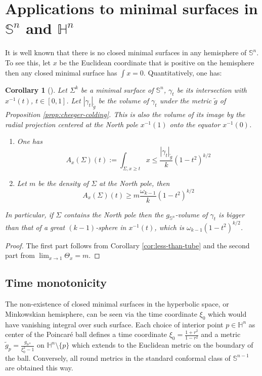 \documentclass[11pt]{article}
\newtheorem{corollary}[theorem]{Corollary}
\begin{document}
\section{Applications to minimal surfaces in \(\mathbb{S}^n\) and \(\mathbb{H}^n\)}
\label{sec:org653a069}
It is well known that there is no closed minimal surfaces in any hemisphere of \(\mathbb{S}^n\).  To see this, let \(x\) be the Euclidean coordinate that is positive on
the hemisphere then any closed minimal surface has \(\int x = 0\). 
Quantitatively, one has:
\begin{corollary}[]
\label{cor:sphere}
Let \(\Sigma^k\) be a minimal surface of \(\mathbb{S}^n\), \(\gamma_t\) be its intersection with \(x^{-1}(t)\), \(t\in[0,1]\). Let
\(|\gamma_t|_{\tilde g}\) be the volume of \(\gamma_t\) under the metric \(\tilde g\) of Proposition \ref{prop:cheeger-colding}. This is also the volume of its
image by the radial projection centered at the North pole \(x^{-1}(1)\) onto the equator \(x^{-1}(0)\).
\begin{enumerate}
\item One has 
\begin{equation}
\label{eq:cor-sphere-1}
  A_x(\Sigma)(t):=\int_{\Sigma, x\geq t}x  \leq \frac{|\gamma_t|_{\tilde g}}{k} (1-t^2)^{k/2}
\end{equation}
\item Let \(m\) be the density of \(\Sigma\) at the North pole, then
\begin{equation}
\label{eq:cor-sphere-2}
A_x(\Sigma)(t) \geq m\frac{\omega_{k-1}}{k}(1-t^2)^{k/2}   
\end{equation}
\end{enumerate}
In particular, if \(\Sigma\) contains the North pole then the \(g_{\mathbb{S}^n}\)-volume of \(\gamma_t\) is bigger than that of a great \((k-1)\)-sphere in \(x^{-1}(t)\), which is \(\omega_{k-1}(1-t^2)^{k/2}\).
\end{corollary}
\begin{proof}
The first part follows from Corollary \ref{cor:less-than-tube} and the second part
from \(\lim_{x\to 1}\Theta_x = m\).
\end{proof}


\subsection{Time monotonicity}
\label{sec:org9e25915}
The non-existence of closed minimal surfaces in the hyperbolic space, or
Minkowskian hemisphere, can
be seen via the time coordinate \(\xi_0\) which would have vanishing integral over such
surface. Each choice of interior point \(p\in \mathbb{H}^n\) as center of the Poincaré ball defines a
time coordinate \(\xi_0=\frac{1+r^2}{1-r^2}\) and a metric
\(\tilde g_p = \frac{g_{\mathbb{H}^n}}{\xi_0^2 - 1}\) on \({\mathbb{H}^n\setminus\{p\}}\) which extends to the Euclidean metric on the boundary of
the ball.  Conversely, all round metrics in
the standard conformal class of \(\mathbb{S}^{n-1}\) are obtained this way. 
\end{document}
